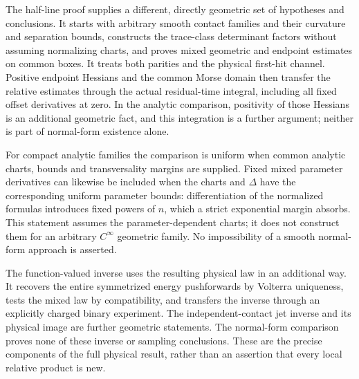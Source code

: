 The half-line proof supplies a different, directly geometric set of
hypotheses and conclusions. It starts with arbitrary smooth contact
families and their curvature and separation bounds, constructs the
trace-class determinant factors without assuming normalizing charts,
and proves mixed geometric and endpoint estimates on common boxes.
It treats both parities and the physical first-hit channel. Positive
endpoint Hessians and the common Morse domain then transfer the
relative estimates through the actual residual-time integral, including
all fixed offset derivatives at zero. In the analytic comparison,
positivity of those Hessians is an additional geometric fact, and this
integration is a further argument; neither is part of normal-form
existence alone.

For compact analytic families the comparison is uniform when common
analytic charts, bounds and transversality margins are supplied.
Fixed mixed parameter derivatives can likewise be included when the
charts and $\Delta$ have the corresponding uniform parameter bounds:
differentiation of the normalized formulas introduces fixed powers of
$n$, which a strict exponential margin absorbs. This statement assumes
the parameter-dependent charts; it does not construct them for an
arbitrary $C^\infty$ geometric family. No impossibility of a smooth
normal-form approach is asserted.

The function-valued inverse uses the resulting physical law in an
additional way. It recovers the entire symmetrized energy pushforwards
by Volterra uniqueness, tests the mixed law by compatibility, and
transfers the inverse through an explicitly charged binary experiment.
The independent-contact jet inverse and its physical image are further
geometric statements. The normal-form comparison proves none of these
inverse or sampling conclusions. These are the precise components of
the full physical result, rather than an assertion that every local
relative product is new.
